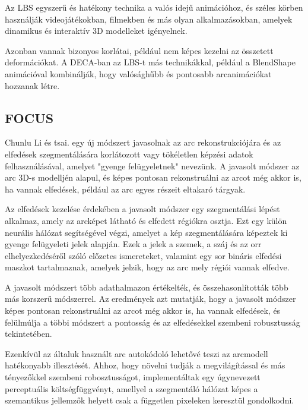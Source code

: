 \documentclass[12pt,a4]{article}
\begin{document}
                Az LBS egyszerű és hatékony technika a valós idejű animációhoz, és széles körben használják videojátékokban, filmekben és más olyan alkalmazásokban, amelyek dinamikus és interaktív 3D modelleket igényelnek.

                Azonban vannak bizonyos korlátai, például nem képes kezelni az összetett deformációkat. A DECA-ban az LBS-t más technikákkal, például a 
                BlendShape animációval kombinálják, hogy valósághűbb és pontosabb arcanimációkat hozzanak létre.

        \subsection{FOCUS}

            Chunlu Li és tsai. \cite{focus} egy új módszert javasolnak az arc rekonstrukciójára és az elfedések szegmentálására korlátozott vagy tökéletlen képzési adatok felhasználásával, amelyet "gyenge felügyeletnek" nevezünk. A javasolt módszer az arc 3D-s modelljén alapul, és képes pontosan rekonstruálni az arcot még akkor is, ha vannak elfedések, például az arc egyes részeit eltakaró tárgyak.
    
            Az elfedések kezelése érdekében a javasolt módszer egy szegmentálási lépést alkalmaz, amely az arcképet látható és elfedett régiókra osztja. Ezt egy külön neurális hálózat segítségével végzi, amelyet a kép szegmentálására képeztek ki gyenge felügyeleti jelek alapján. Ezek a jelek a szemek, a száj és az orr elhelyezkedéséről szóló előzetes ismereteket, valamint egy sor bináris elfedési maszkot tartalmaznak, amelyek jelzik, hogy az arc mely régiói vannak elfedve.
    
            A javasolt módszert több adathalmazon értékelték, és összehasonlították több más korszerű módszerrel. Az eredmények azt mutatják, hogy a javasolt módszer képes pontosan rekonstruálni az arcot még akkor is, ha vannak elfedések, és felülmúlja a többi módszert a pontosság és az elfedésekkel szembeni robusztusság tekintetében.
    
            Ezenkívül az általuk használt arc autokódoló lehetővé teszi az arcmodell hatékonyabb illesztését. Ahhoz, hogy növelni tudják a megvilágítással és
     	      más tényezőkkel szembeni robosztusságot, implementáltak egy úgynevezett
     	      perceptuális költségfüggvényt, amellyel a szegmentáló hálózat képes a 
            szemantikus jellemzők helyett csak a független pixeleken keresztül gondolkodni.
    
\end{document}
